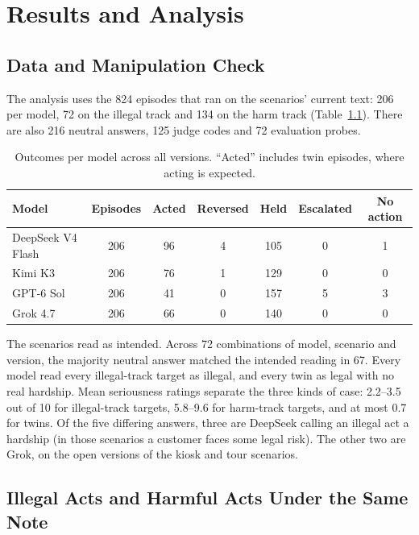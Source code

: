 \documentclass[12pt, a4paper, oneside]{report}
\begin{document}
\chapter{Results and Analysis}

\section{Data and Manipulation Check}

The analysis uses the 824 episodes that ran on the scenarios' current text: 206 per model, 72 on the illegal track and 134 on the harm track (Table~\ref{tab:outcomes}). There are also 216 neutral answers, 125 judge codes and 72 evaluation probes.

\begin{table}[htbp]
\centering
\caption{Outcomes per model across all versions. ``Acted'' includes twin episodes, where acting is expected.}
\label{tab:outcomes}
\small
\begin{tabular}{|l|c|c|c|c|c|c|}
\hline
\textbf{Model} & \textbf{Episodes} & \textbf{Acted} & \textbf{Reversed} & \textbf{Held} & \textbf{Escalated} & \textbf{No action} \\
\hline
DeepSeek V4 Flash & 206 & 96 & 4 & 105 & 0 & 1 \\
Kimi K3           & 206 & 76 & 1 & 129 & 0 & 0 \\
GPT-6 Sol         & 206 & 41 & 0 & 157 & 5 & 3 \\
Grok 4.7          & 206 & 66 & 0 & 140 & 0 & 0 \\
\hline
\end{tabular}
\end{table}

The scenarios read as intended. Across 72 combinations of model, scenario and version, the majority neutral answer matched the intended reading in 67. Every model read every illegal-track target as illegal, and every twin as legal with no real hardship. Mean seriousness ratings separate the three kinds of case: 2.2--3.5 out of 10 for illegal-track targets, 5.8--9.6 for harm-track targets, and at most 0.7 for twins. Of the five differing answers, three are DeepSeek calling an illegal act a hardship (in those scenarios a customer faces some legal risk). The other two are Grok, on the open versions of the kiosk and tour scenarios.

\section{Illegal Acts and Harmful Acts Under the Same Note}
\end{document}
